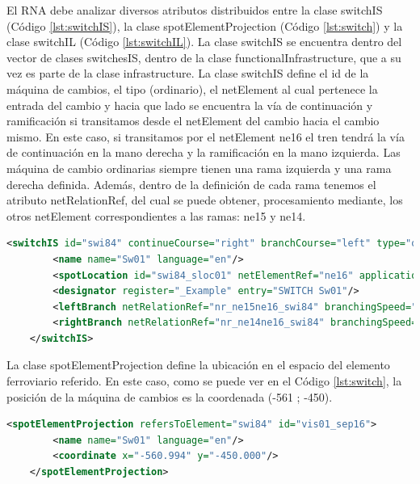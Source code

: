     El RNA debe analizar diversos atributos distribuidos entre la clase switchIS (Código \ref{lst:switchIS}), la clase spotElementProjection (Código \ref{lst:switch}) y la clase switchIL (Código \ref{lst:switchIL}). La clase switchIS se encuentra dentro del vector de clases switchesIS, dentro de la clase functionalInfrastructure, que a su vez es parte de la clase infrastructure. La clase switchIS define el id de la máquina de cambios, el tipo (ordinario), el netElement al cual pertenece la entrada del cambio y hacia que lado se encuentra la vía de continuación y ramificación si transitamos desde el netElement del cambio hacia el cambio mismo. En este caso, si transitamos por el netElement ne16 el tren tendrá la vía de continuación en la mano derecha y la ramificación en la mano izquierda. Las máquina de cambio ordinarias siempre tienen una rama izquierda y una rama derecha definida. Además, dentro de la definición de cada rama tenemos el atributo netRelationRef, del cual se puede obtener, procesamiento mediante, los otros netElement correspondientes a las ramas: ne15 y ne14.

    \begin{lstlisting}[language = XML, caption = Clase switchIS switchIS , label = {lst:switchIS}]
    <switchIS id="swi84" continueCourse="right" branchCourse="left" type="ordinarySwitch">
        <name name="Sw01" language="en"/>
        <spotLocation id="swi84_sloc01" netElementRef="ne16" applicationDirection="reverse" intrinsicCoord="0.0000"/>
        <designator register="_Example" entry="SWITCH Sw01"/>
        <leftBranch netRelationRef="nr_ne15ne16_swi84" branchingSpeed="0" joiningSpeed="0" radius="-500"/>
        <rightBranch netRelationRef="nr_ne14ne16_swi84" branchingSpeed="0" joiningSpeed="0" radius="0"/>
    </switchIS>
    \end{lstlisting}

    La clase spotElementProjection define la ubicación en el espacio del elemento ferroviario referido. En este caso, como se puede ver en el Código \ref{lst:switch}, la posición de la máquina de cambios es la coordenada (-561 ; -450).

    \begin{lstlisting}[language = XML, caption = Clase spotElementProjection , label = {lst:switch}]
    <spotElementProjection refersToElement="swi84" id="vis01_sep16">
        <name name="Sw01" language="en"/>
        <coordinate x="-560.994" y="-450.000"/>
    </spotElementProjection>
    \end{lstlisting}

